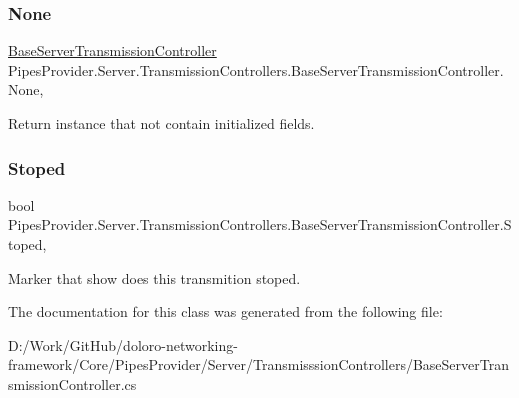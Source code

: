 \subsubsection{\texorpdfstring{None}{None}}
{\footnotesize\ttfamily \mbox{\hyperlink{class_pipes_provider_1_1_server_1_1_transmission_controllers_1_1_base_server_transmission_controller}{Base\+Server\+Transmission\+Controller}} Pipes\+Provider.\+Server.\+Transmission\+Controllers.\+Base\+Server\+Transmission\+Controller.\+None\hspace{0.3cm}{\ttfamily [static]}, {\ttfamily [get]}}



Return instance that not contain initialized fields. 

\mbox{\label{class_pipes_provider_1_1_server_1_1_transmission_controllers_1_1_base_server_transmission_controller_ae159fdf4582f9419d9e3616d2aa2d37e}} 
\subsubsection{\texorpdfstring{Stoped}{Stoped}}
{\footnotesize\ttfamily bool Pipes\+Provider.\+Server.\+Transmission\+Controllers.\+Base\+Server\+Transmission\+Controller.\+Stoped\hspace{0.3cm}{\ttfamily [get]}, {}}



Marker that show does this transmition stoped. 



The documentation for this class was generated from the following file\+:\begin{DoxyCompactItemize}
\item 
D\+:/\+Work/\+Git\+Hub/doloro-\/networking-\/framework/\+Core/\+Pipes\+Provider/\+Server/\+Transmisssion\+Controllers/Base\+Server\+Transmission\+Controller.\+cs\end{DoxyCompactItemize}

